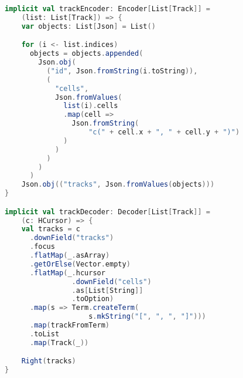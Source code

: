 \begin{lstlisting}[language=Scala, caption=Impliciti per le operazioni di codifica, label=code:coder]
implicit val trackEncoder: Encoder[List[Track]] =
    (list: List[Track]) => {
    var objects: List[Json] = List()

    for (i <- list.indices)
      objects = objects.appended(
        Json.obj(
          ("id", Json.fromString(i.toString)),
          (
            "cells",
            Json.fromValues(
              list(i).cells
              .map(cell =>
                Json.fromString(
                    "c(" + cell.x + ", " + cell.y + ")")
              )
            )
          )
        )
      )
    Json.obj(("tracks", Json.fromValues(objects)))
}

implicit val trackDecoder: Decoder[List[Track]] =
    (c: HCursor) => {
    val tracks = c
      .downField("tracks")
      .focus
      .flatMap(_.asArray)
      .getOrElse(Vector.empty)
      .flatMap(_.hcursor
                .downField("cells")
                .as[List[String]]
                .toOption)
      .map(s => Term.createTerm(
                    s.mkString("[", ", ", "]")))
      .map(trackFromTerm)
      .toList
      .map(Track(_))

    Right(tracks)
}
\end{lstlisting}
